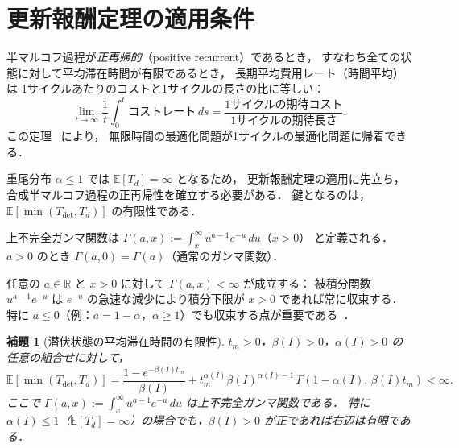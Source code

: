 \documentclass[12pt,a4paper]{article}
\theoremstyle{plain}
\newtheorem{lemma}[theorem]{補題}
\theoremstyle{definition}
\theoremstyle{remark}
\newcommand{\E}{\mathbb{E}}
\newcommand{\Tdet}{T_{\mathrm{det}}}
\newcommand{\betaI}{\beta(I)}
\newcommand{\alphI}{\alpha(I)}
\begin{document}
\section{更新報酬定理の適用条件}
\label{sec:renewal}

\begin{tcolorbox}[mathbox, title={更新報酬定理（Renewal Reward Theorem）}]
半マルコフ過程が\emph{正再帰的}（positive recurrent）であるとき，
すなわち全ての状態に対して平均滞在時間が有限であるとき，
長期平均費用レート（時間平均）は 1サイクルあたりのコストと1サイクルの長さの比に等しい：
\[
\lim_{t\to\infty}\frac{1}{t}\int_0^t \text{コストレート}\,ds
=\frac{\text{1サイクルの期待コスト}}{\text{1サイクルの期待長さ}}.
\]
この定理~\cite{ross2014,cox1962,karlin1975,asmussen2003} により，
無限時間の最適化問題が1サイクルの最適化問題に帰着できる．
\end{tcolorbox}

重尾分布 $\alpha\le1$ では $\E[T_d]=\infty$ となるため，
更新報酬定理の適用に先立ち，合成半マルコフ過程の正再帰性を確立する必要がある．
鍵となるのは，$\E[\min(\Tdet,T_d)]$ の有限性である．

\begin{tcolorbox}[keybox, title={上不完全ガンマ関数（Upper Incomplete Gamma Function）}]
上不完全ガンマ関数は
$\Gamma(a,x):=\int_x^\infty u^{a-1}e^{-u}\,du$（$x>0$）
と定義される．$a>0$ のとき $\Gamma(a,0)=\Gamma(a)$（通常のガンマ関数）．

任意の $a\in\mathbb{R}$ と $x>0$ に対して $\Gamma(a,x)<\infty$ が成立する：
被積分関数 $u^{a-1}e^{-u}$ は $e^{-u}$ の急速な減少により積分下限が $x>0$ であれば常に収束する．
特に $a\le0$（例：$a=1-\alpha$，$\alpha\ge1$）でも収束する点が重要である~\cite{abramowitz1965,nist_dlmf}．
\end{tcolorbox}

\begin{lemma}[潜伏状態の平均滞在時間の有限性]\label{lem:sojourn}
$t_m>0$，$\betaI>0$，$\alphI>0$ の任意の組合せに対して，
\begin{equation}\label{eq:E_min}
\E[\min(\Tdet,T_d)]
=\frac{1-e^{-\betaI t_m}}{\betaI}
+t_m^{\alphI}\betaI^{\alphI-1}\,\Gamma(1-\alphI,\,\betaI t_m)<\infty.
\end{equation}
ここで $\Gamma(a,x):=\int_x^\infty u^{a-1}e^{-u}\,du$ は上不完全ガンマ関数である．
特に $\alphI\le1$（$\E[T_d]=\infty$）の場合でも，$\betaI>0$ が正であれば右辺は有限である．
\end{lemma}
\end{document}
